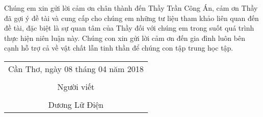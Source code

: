 \documentclass[./thesis.tex]{subfiles}
\begin{document}
Chúng em xin gửi lời cảm ơn chân thành đến Thầy Trần Công Án, cảm ơn Thầy đã gợi ý đề tài và cung cấp cho chúng em những tư liệu tham khảo liên quan đến đề tài, đặc biệt là sự quan tâm của Thầy đối với chúng em trong suốt quá trình thực hiện niên luận này. Chúng con xin gửi lời cảm ơn đến gia đình luôn bên cạnh hỗ trợ cả về vật chất lẫn tinh thần để chúng con tập trung học tập.

\hspace*{\fill}
\begin{tabular}{@{}c@{}} 
Cần Thơ, ngày 08 tháng 04 năm 2018\\ \\
Người viết\\ \\
Dương Lữ Điện
\end{tabular}
\end{document}
